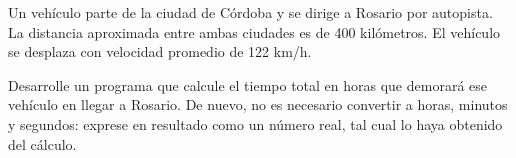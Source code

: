Un vehículo parte de la ciudad de Córdoba y se dirige a Rosario por autopista. La distancia aproximada entre ambas ciudades es de 400 kilómetros. El vehículo se desplaza con velocidad promedio de 122 km/h. 

Desarrolle un programa que calcule el tiempo total en horas que demorará ese vehículo en llegar a Rosario. De nuevo, no es necesario convertir a horas, minutos y segundos: exprese en resultado como un número real, tal cual lo haya obtenido del cálculo.

